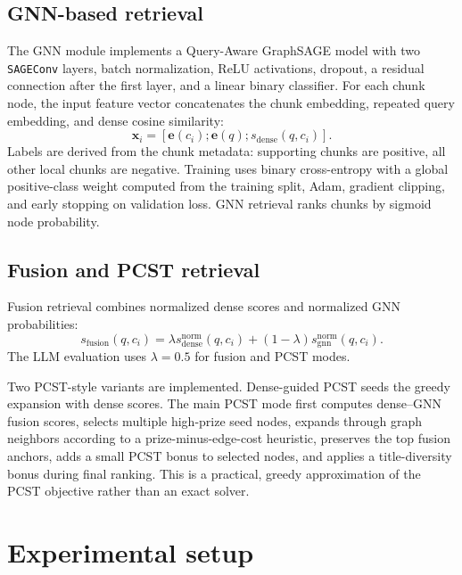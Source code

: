 \documentclass{article}
\begin{document}
\subsection{GNN-based retrieval}

The GNN module implements a Query-Aware GraphSAGE model with two \texttt{SAGEConv} layers, batch normalization, ReLU activations, dropout, a residual connection after the first layer, and a linear binary classifier. For each chunk node, the input feature vector concatenates the chunk embedding, repeated query embedding, and dense cosine similarity:
\begin{equation}
\mathbf{x}_i = [\mathbf{e}(c_i); \mathbf{e}(q); s_{\mathrm{dense}}(q,c_i)].
\end{equation}
Labels are derived from the chunk metadata: supporting chunks are positive, all other local chunks are negative. Training uses binary cross-entropy with a global positive-class weight computed from the training split, Adam, gradient clipping, and early stopping on validation loss. GNN retrieval ranks chunks by sigmoid node probability.

\subsection{Fusion and PCST retrieval}

Fusion retrieval combines normalized dense scores and normalized GNN probabilities:
\begin{equation}
s_{\mathrm{fusion}}(q,c_i)=\lambda s_{\mathrm{dense}}^{\mathrm{norm}}(q,c_i)
 +(1-\lambda)s_{\mathrm{gnn}}^{\mathrm{norm}}(q,c_i).
\end{equation}
The LLM evaluation uses $\lambda=0.5$ for fusion and PCST modes.

Two PCST-style variants are implemented. Dense-guided PCST seeds the greedy expansion with dense scores. The main PCST mode first computes dense--GNN fusion scores, selects multiple high-prize seed nodes, expands through graph neighbors according to a prize-minus-edge-cost heuristic, preserves the top fusion anchors, adds a small PCST bonus to selected nodes, and applies a title-diversity bonus during final ranking. This is a practical, greedy approximation of the PCST objective rather than an exact solver.

\section{Experimental setup}
\end{document}
